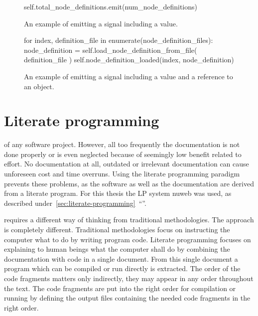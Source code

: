 \documentclass[%
    a4paper,    %
    justified,  %
    nobib,      %
    openany     %
]{tufte-book}
\makeatletter
\renewcommand{\label}[1]{\@tufte@label{##1}}%
\makeatother
\begin{document}
\begin{figure}[!htbp]
  \begin{pythoncode}
self.total_node_definitions.emit(num_node_definitions)
  \end{pythoncode}
  \caption{%
    An example of emitting a signal including a value.
  }
\label{lst:signal-slot-example-1}
\end{figure}

\begin{figure}[!htbp]
  \begin{pythoncode}
for index, definition_file in enumerate(node_definition_files):
    node_definition = self.load_node_definition_from_file(
        definition_file
    )
    self.node_definition_loaded(index, node_definition)
  \end{pythoncode}
  \caption{%
    An example of emitting a signal including a value and a reference to an
    object.
  }
\label{lst:signal-slot-example-2}
\end{figure}

\section{Literate programming}
\label{results:sec:literate-programming}

 of any
software project. However, all too frequently the documentation is not done
properly or is even neglected because of seemingly low benefit related to
effort. No documentation at all, outdated or irrelevant documentation can cause
unforeseen cost and time overruns. Using the literate programming paradigm
prevents these problems, as the software as well as the documentation are
derived from a literate program. For this thesis the LP system nuweb was used,
as described
under~\autoref{sec:literate-programming}~\enquote{}.

 requires a different
way of thinking from traditional methodologies. The approach is completely
different. Traditional methodologies focus on instructing the computer what to
do by writing program code. Literate programming focuses on explaining to human
beings what the computer shall do by combining the documentation with code in a
single document. From this single document a program which can be compiled or
run directly is extracted. The order of the code fragments matters only
indirectly, they may appear in any order throughout the text. The code fragments
are put into the right order for compilation or running by defining the output
files containing the needed code fragments in the right order.
\end{document}
